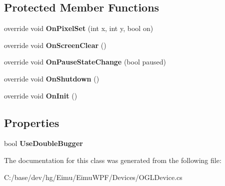 \subsection*{Protected Member Functions}
\begin{DoxyCompactItemize}
\item 
\hypertarget{class_eimu_1_1_devices_1_1_o_g_l_device_a7a2da9e0e230d6eaa12b13b32909552a}{
override void {\bfseries OnPixelSet} (int x, int y, bool on)}
\label{class_eimu_1_1_devices_1_1_o_g_l_device_a7a2da9e0e230d6eaa12b13b32909552a}

\item 
\hypertarget{class_eimu_1_1_devices_1_1_o_g_l_device_aef000f58bf8324964bcd01ccdf687884}{
override void {\bfseries OnScreenClear} ()}
\label{class_eimu_1_1_devices_1_1_o_g_l_device_aef000f58bf8324964bcd01ccdf687884}

\item 
\hypertarget{class_eimu_1_1_devices_1_1_o_g_l_device_a510009fa0e1ef73969ffbb3fa4cc9537}{
override void {\bfseries OnPauseStateChange} (bool paused)}
\label{class_eimu_1_1_devices_1_1_o_g_l_device_a510009fa0e1ef73969ffbb3fa4cc9537}

\item 
\hypertarget{class_eimu_1_1_devices_1_1_o_g_l_device_ab5f9ed65baaf584f55f7fc14fffcf699}{
override void {\bfseries OnShutdown} ()}
\label{class_eimu_1_1_devices_1_1_o_g_l_device_ab5f9ed65baaf584f55f7fc14fffcf699}

\item 
\hypertarget{class_eimu_1_1_devices_1_1_o_g_l_device_a6eb5830ec5ed8bf1cf98fbe5afc1364a}{
override void {\bfseries OnInit} ()}
\label{class_eimu_1_1_devices_1_1_o_g_l_device_a6eb5830ec5ed8bf1cf98fbe5afc1364a}

\end{DoxyCompactItemize}
\subsection*{Properties}
\begin{DoxyCompactItemize}
\item 
\hypertarget{class_eimu_1_1_devices_1_1_o_g_l_device_a790a40da04196d96ad0682189f979aa1}{
bool {\bfseries UseDoubleBugger}}
\label{class_eimu_1_1_devices_1_1_o_g_l_device_a790a40da04196d96ad0682189f979aa1}

\end{DoxyCompactItemize}


The documentation for this class was generated from the following file:\begin{DoxyCompactItemize}
\item 
C:/base/dev/hg/Eimu/EimuWPF/Devices/OGLDevice.cs\end{DoxyCompactItemize}
